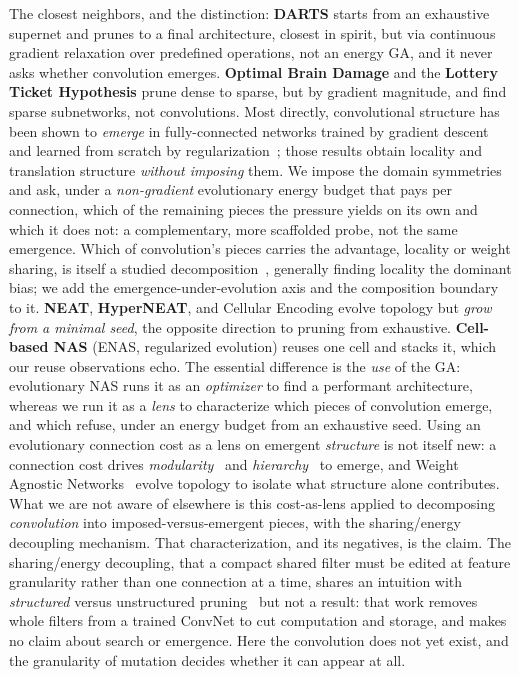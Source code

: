 \documentclass[11pt]{article}
\begin{document}
The closest neighbors, and the distinction: \textbf{DARTS} starts from an exhaustive supernet and
prunes to a final architecture, closest in spirit, but via continuous gradient relaxation over
predefined operations, not an energy GA, and it never asks whether convolution emerges. \textbf{Optimal
Brain Damage} and the \textbf{Lottery Ticket Hypothesis} prune dense to sparse, but by gradient
magnitude, and find sparse subnetworks, not convolutions. Most directly, convolutional structure has been
shown to \emph{emerge} in fully-connected networks trained by gradient descent~\cite{ingrosso} and learned
from scratch by regularization~\cite{neyshabur}; those results obtain locality and translation structure
\emph{without imposing} them. We impose the domain symmetries and ask, under a \emph{non-gradient}
evolutionary energy budget that pays per connection, which of the remaining pieces the pressure yields on
its own and which it does not: a complementary, more scaffolded probe, not the same emergence. Which of
convolution's pieces carries the advantage, locality or weight sharing, is itself a studied
decomposition~\cite{indbias,localshare}, generally finding locality the dominant bias; we add the
emergence-under-evolution axis and the composition boundary to it. \textbf{NEAT}, \textbf{HyperNEAT}, and
Cellular Encoding evolve topology but \emph{grow from a minimal seed}, the opposite direction to pruning
from exhaustive. \textbf{Cell-based NAS} (ENAS, regularized evolution) reuses one cell and stacks it,
which our reuse observations echo. The essential difference is the \emph{use} of the GA: evolutionary NAS
runs it as an \emph{optimizer} to find a performant architecture, whereas we run it as a \emph{lens} to
characterize which pieces of convolution emerge, and which refuse, under an energy budget from an
exhaustive seed. Using an evolutionary connection cost as a lens on emergent \emph{structure} is not itself
new: a connection cost drives \emph{modularity}~\cite{clune} and \emph{hierarchy}~\cite{mengistu} to emerge,
and Weight Agnostic Networks~\cite{wann} evolve topology to isolate what structure alone contributes. What
we are not aware of elsewhere is this cost-as-lens applied to decomposing \emph{convolution} into
imposed-versus-emergent pieces, with the sharing/energy decoupling mechanism. That characterization, and its
negatives, is the claim. The sharing/energy decoupling, that a compact shared filter must be edited at
feature granularity rather than one connection at a time, shares an intuition with \emph{structured} versus
unstructured pruning~\cite{prunefilters} but not a result: that work removes whole filters from a trained
ConvNet to cut computation and storage, and makes no claim about search or emergence. Here the convolution
does not yet exist, and the granularity of mutation decides whether it can appear at all.
\end{document}
